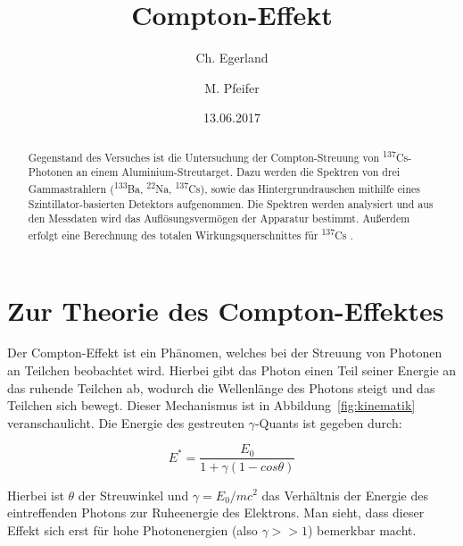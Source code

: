 \documentclass[aps,twocolumn,secnumarabic,nobalancelastpage,amsmath,amssymb,
nofootinbib,superscriptaddress]{revtex4-1}
\begin{document}
\title{Compton-Effekt}
\author         {Ch. Egerland}
\author         {M. Pfeifer}

\date[Versuchsdatum: ]{13.06.2017}

\begin{abstract}
  \noindent Gegenstand des Versuches ist die Untersuchung der Compton-Streuung von \textsuperscript{137}Cs-Photonen an einem Aluminium-Streutarget.
  Dazu werden die Spektren von drei Gammastrahlern (\textsuperscript{133}Ba, \textsuperscript{22}Na, \textsuperscript{137}Cs), sowie das Hintergrundrauschen
  mithilfe eines Szintillator-basierten Detektors aufgenommen. Die Spektren werden analysiert und aus den Messdaten wird das Auflösungsvermögen der Apparatur bestimmt.
  Außerdem erfolgt eine Berechnung des totalen Wirkungsquerschnittes für \textsuperscript{137}Cs .
\end{abstract}


\maketitle



\section{Zur Theorie des Compton-Effektes}
Der Compton-Effekt ist ein Phänomen, welches bei der Streuung von Photonen an
Teilchen beobachtet wird. Hierbei gibt das Photon einen Teil seiner Energie an das
ruhende Teilchen ab, wodurch die Wellenlänge des Photons steigt und das Teilchen
sich bewegt. Dieser Mechanismus ist in Abbildung~\cref{fig:kinematik} veranschaulicht.
Die Energie des gestreuten $\gamma$-Quants ist gegeben durch:

  \begin{equation}
    E^* = \frac{E_0}{1+\gamma(1- cos \theta)}
    \label{eq:streuenergie}
  \end{equation}

Hierbei ist $\theta$ der Streuwinkel und $\gamma = E_0/mc^2$ das Verhältnis der
Energie des eintreffenden Photons zur Ruheenergie des Elektrons. Man sieht, dass
dieser Effekt sich erst für hohe Photonenergien (also $\gamma >> 1$) bemerkbar
macht.
\end{document}
